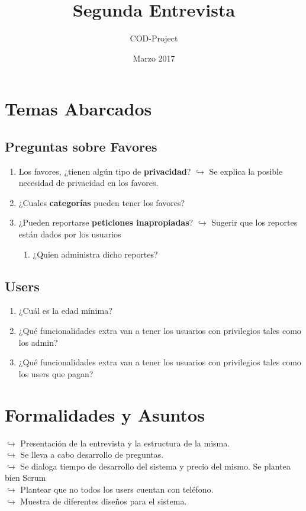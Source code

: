 \documentclass[a4paper,10pt]{article}
\title{Segunda Entrevista}
\author{ COD-Project }
\date{Marzo 2017}
\begin{document}
\maketitle


\section{Temas Abarcados}
\subsection{Preguntas sobre Favores}

\begin{enumerate}
    \item Los favores, ¿tienen algún tipo de \textbf{privacidad}?
        \subitem $\hookrightarrow{}$ Se explica la posible necesidad de privacidad en los favores.
    \item ¿Cuales \textbf{categorías} pueden tener los favores?
    \item ¿Pueden reportarse \textbf{peticiones inapropiadas}?
        \subitem$\hookrightarrow{}$ Sugerir que los reportes están dados por los usuarios
        \begin{enumerate}
            \item ¿Quien administra dicho reportes?
        \end{enumerate}
\end{enumerate}

\subsection{Users}
\begin{enumerate}
    \item ¿Cuál es la edad mínima?
    \item ¿Qué funcionalidades extra van a tener los usuarios con privilegios tales como los admin?
    \item ¿Qué funcionalidades extra van a tener los usuarios con privilegios tales como los users que pagan?
\end{enumerate}


\section{Formalidades y Asuntos}
$\hookrightarrow{}$ Presentación de la entrevista y la estructura de la misma. \\
$\hookrightarrow{}$ Se lleva a cabo desarrollo de preguntas. \\
$\hookrightarrow{}$ Se dialoga tiempo de desarrollo del sistema y precio del mismo. Se plantea bien Scrum \\
$\hookrightarrow{}$ Plantear que no todos los users cuentan con teléfono. \\
$\hookrightarrow{}$ Muestra de diferentes diseños para el sistema.
\end{document}
